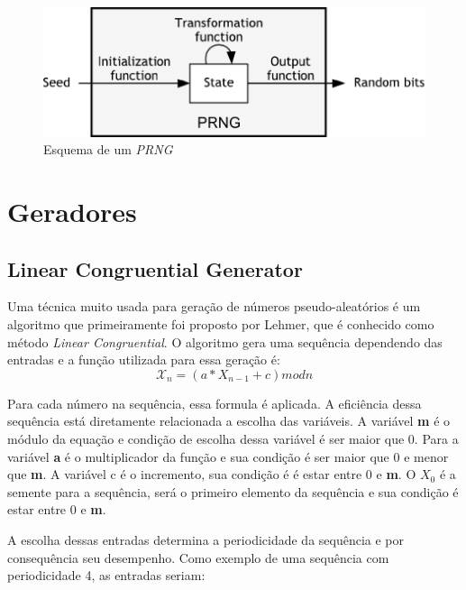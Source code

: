 \begin{figure}[h]
	\centering
	\includegraphics[scale=1]
	{figuras/prng.eps}
	\caption[Esquema de um \textit{PRNG}]{Esquema de um \textit{PRNG}\protect\footnotemark}
\end{figure}


\section{Geradores}
\subsection{Linear Congruential Generator}

Uma técnica muito usada para geração de números pseudo-aleatórios é um algoritmo que primeiramente foi proposto por Lehmer, que é conhecido como método \textit{Linear Congruential}. \cite{william-stallings} O algoritmo gera uma sequência dependendo das entradas e a função utilizada para essa geração é:
\begin{equation}
	\label{Função para geração de números aleatórios.}
	\mathcal{X}_n = (a * X_{n - 1} + c) mod n
\end{equation}

Para cada número na sequência, essa formula é aplicada. A eficiência dessa sequência está diretamente relacionada a escolha das variáveis. A variável \textbf{m} é o módulo da equação e condição de escolha dessa variável é ser maior que 0. Para a variável \textbf{a} é o multiplicador da função e sua condição é ser maior que 0 e menor que \textbf{m}. A variável c é o incremento, sua condição é é estar entre 0 e \textbf{m}. O \textbf{$X_0$} é a semente para a sequência, será o primeiro elemento da sequência e sua condição é estar entre 0 e \textbf{m}.

A escolha dessas entradas determina a periodicidade da sequência e por consequência seu desempenho. Como exemplo de uma sequência com periodicidade 4, as entradas seriam:

